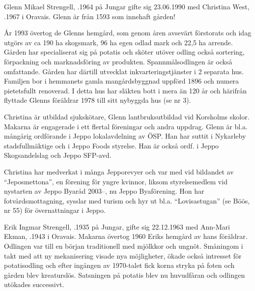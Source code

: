 


Glenn Mikael Strengell, .1964 på Jungar gifte sig 23.06.1990 med Christina West, .1967 i  Oravais. Glenn är  från 1593 som innehaft gården!

År 1993 övertog de Glenns hemgård, som genom åren avsevärt förstorats och idag utgörs av ca 190 ha skogsmark, 96 ha egen odlad mark och 22,5 ha arrende. Gården har specialiserat sig på potatis och sköter utöver odling också sortering, förpackning och marknadsföring av produkten. Spannmålsodlingen är också omfattande. Gården har därtill utvecklat inkvarteringstjänster i 2 separata hus. Familjen bor i hemmanets gamla mangårdsbyggnad uppförd 1896 och numera pietetsfullt renoverad. I detta hus har släkten bott i mera än 120 år och härifrån flyttade Glenns föräldrar 1978 till sitt nybyggda hus (se nr 3).

Christina är utbildad sjukskötare, Glenn lantbruksutbildad vid Korsholms skolor. Makarna är engagerade i ett flertal föreningar och andra uppdrag. Glenn är bl.a. mångårig ordförande i Jeppo lokalavdelning av ÖSP. Han har suttit i Nykarleby stadsfullmäktige och i Jeppo Foods styrelse. Han är också ordf. i Jeppo Skogsandelslag och Jeppo SFP-avd.

Christina har medverkat i många Jepporevyer och var med vid bildandet av ``Jeposmettona'', en förening för yngre kvinnor, liksom styrelsemedlem vid nystarten av Jeppo Byaråd 2003--, nu Jeppo Byaförening. Hon har fotvårdsmottagning, sysslar med turism och hyr ut bl.a. ``Lovisastugan'' (se Böös, nr 55) för övernattningar i Jeppo.
\begin{jhchildren}
  \item {}
  \item {}
  \item {}
  \item {}
\end{jhchildren}


Erik Ingmar Strengell, .1935 på Jungar, gifte sig 22.12.1963 med Ann-Mari Ekman, .1943 i Oravais. Makarna övertog 1960 Eriks hemgård av hans föräldrar. Odlingen var till en början traditionell med mjölkkor och ungnöt. Småningom i takt med att ny mekanisering visade nya möjligheter, ökade också intresset för potatisodling och efter ingången av 1970-talet fick korna stryka på foten och gården blev kreaturslös. Satsningen på potatis blev nu huvudfåran och odlingen utökades successivt.

